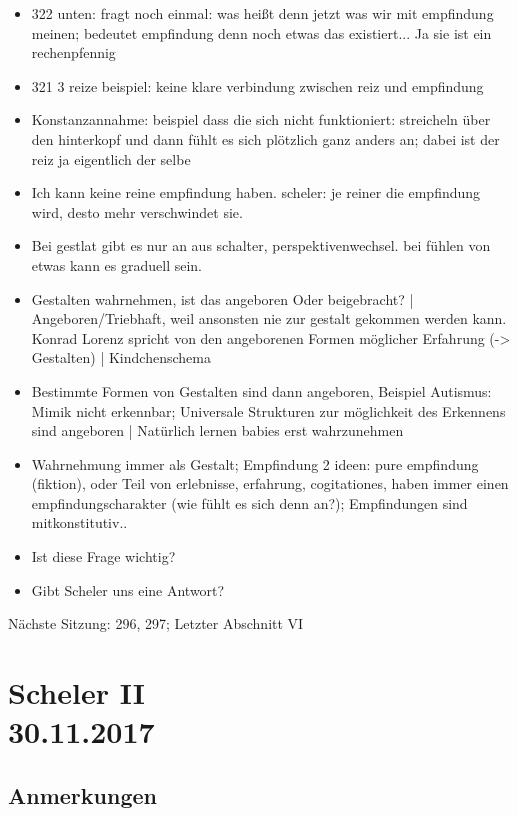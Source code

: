 \documentclass[emulatestandardclasses]{scrartcl}
\begin{document}
\begin{itemize}
  \item 322 unten: fragt noch einmal: was heißt denn jetzt was wir mit empfindung meinen; bedeutet empfindung denn noch etwas das existiert... Ja sie ist ein rechenpfennig
  \item 321 3 reize beispiel: keine klare verbindung zwischen reiz und empfindung
  \item Konstanzannahme: beispiel dass die sich nicht funktioniert: streicheln über den hinterkopf und dann fühlt es sich plötzlich ganz anders an; dabei ist der reiz ja eigentlich der selbe
  \item Ich kann keine reine empfindung haben. scheler: je reiner die empfindung wird, desto mehr verschwindet sie. 
  \item Bei gestlat gibt es nur an aus schalter, perspektivenwechsel. bei fühlen von etwas kann es graduell sein.
  \item Gestalten wahrnehmen, ist das angeboren Oder beigebracht? | Angeboren/Triebhaft, weil ansonsten nie zur gestalt gekommen werden kann. Konrad Lorenz spricht von den angeborenen Formen möglicher Erfahrung (-> Gestalten) | Kindchenschema
  \item Bestimmte Formen von Gestalten sind dann angeboren, Beispiel Autismus: Mimik nicht erkennbar; Universale Strukturen zur möglichkeit des Erkennens sind angeboren | Natürlich lernen babies erst wahrzunehmen
  \item Wahrnehmung immer als Gestalt; Empfindung 2 ideen: pure empfindung (fiktion), oder Teil von erlebnisse, erfahrung, cogitationes, haben immer einen empfindungscharakter (wie fühlt es sich denn an?); Empfindungen sind mitkonstitutiv..
  \item Ist diese Frage wichtig?
  \item Gibt Scheler uns eine Antwort?
\end{itemize}

Nächste Sitzung: 296, 297; Letzter Abschnitt VI 

\section{Scheler II\\30.11.2017}

\subsection{Anmerkungen}
\end{document}
